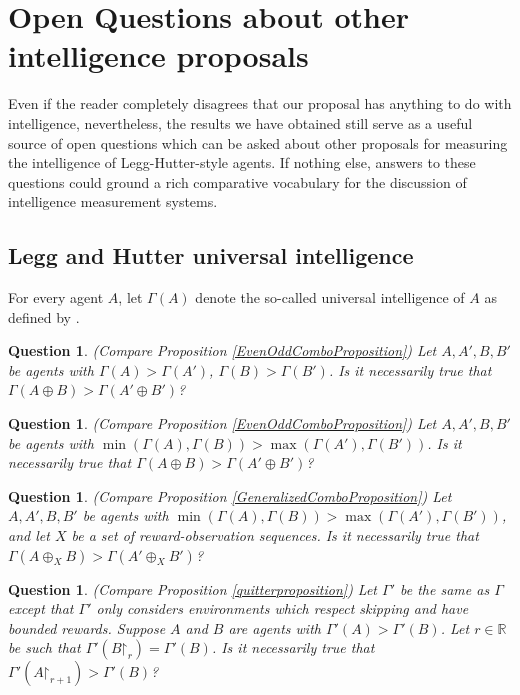 \documentclass[twoside,11pt]{article}
\newtheorem{question}[theorem]{Question}
\begin{document}
\section{Open Questions about other intelligence proposals}
\label{openquestionsection}

Even if the reader completely disagrees that our proposal has anything to do with
intelligence, nevertheless, the results we have obtained still serve as
a useful source of open questions which can be asked about other proposals for
measuring the intelligence of Legg-Hutter-style agents.
If nothing else, answers to these questions could ground a rich comparative
vocabulary for the discussion of intelligence measurement systems.


\subsection{Legg and Hutter universal intelligence}

For every agent $A$, let $\varGamma(A)$ denote the so-called universal intelligence of $A$
as defined by \citet{hutter2007}.

\begin{question}
\label{FirstOpenQuestion}
    (Compare Proposition \ref{EvenOddComboProposition})
    Let $A,A',B,B'$ be agents with $\varGamma(A)>\varGamma(A')$,
    $\varGamma(B)>\varGamma(B')$.
    Is it necessarily true that $\varGamma(A\oplus B)>\varGamma(A'\oplus B')$?
\end{question}

\begin{question}
    (Compare Proposition \ref{EvenOddComboProposition})
    Let $A,A',B,B'$ be agents
    with $\min(\varGamma(A),\varGamma(B))>\max(\varGamma(A'),\varGamma(B'))$.
    Is it necessarily true that $\varGamma(A\oplus B)>\varGamma(A'\oplus B')$?
\end{question}

\begin{question}
    (Compare Proposition \ref{GeneralizedComboProposition})
    Let $A,A',B,B'$ be agents
    with $\min(\varGamma(A),\varGamma(B))>\max(\varGamma(A'),\varGamma(B'))$,
    and let $X$ be a set of reward-observation sequences.
    Is it necessarily true that $\varGamma(A\oplus_X B)>\varGamma(A'\oplus_X B')$?
\end{question}

\begin{question}
\label{LastOpenQuestion}
    (Compare Proposition \ref{quitterproposition})
    Let $\varGamma'$ be the same as $\varGamma$ except that $\varGamma'$ only considers
    environments which respect skipping and have bounded rewards.
    Suppose $A$ and $B$ are agents with $\varGamma'(A)>\varGamma'(B)$.
    Let $r\in\mathbb R$
    be such that $\varGamma'(B\mathord{\restriction}_{r})=\varGamma'(B)$.
    Is it necessarily true that
    $\varGamma'(A\mathord{\restriction}_{r+1})>\varGamma'(B)$?
\end{question}
\end{document}
